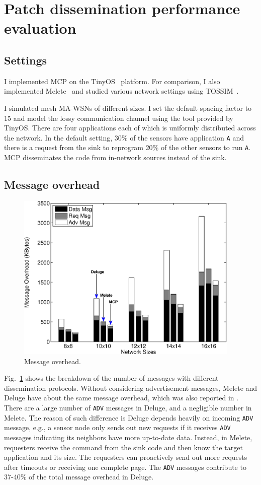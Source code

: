 \section{Patch dissemination performance evaluation}
\subsection{Settings}
I implemented MCP on the TinyOS~\cite{tinyos} platform. For comparison, I also implemented Melete~\cite{melete} and 
studied various network settings using TOSSIM~\cite{tossim}. 

I simulated mesh MA-WSNs of different sizes. I set the default spacing factor to 15 and model the lossy communication 
channel using the tool provided by TinyOS. There are four applications each of which is uniformly distributed across 
the network. In the default setting, 30\% of the sensors have application {\tt A} and there is a request from the sink 
to reprogram 20\% of the other sensors to run {\tt A}. MCP disseminates the code from in-network sources instead of the 
sink. 

\subsection{Message overhead}

\begin{figure}[htbp]
\centering
\includegraphics[width=4.2in]{figures/fsizes.eps}
\caption{Message overhead.}
\label{fmsg}
\end{figure}

Fig.~\ref{fmsg} shows the breakdown of the number of messages with different dissemination protocols. Without 
considering advertisement messages, Melete and Deluge have about the same message overhead, which was also reported in 
\cite{melete}. There are a large number of {\tt ADV} messages in Deluge, and a negligible number in Melete. The reason 
of such difference is Deluge depends heavily on incoming {\tt ADV} message, e.g., a sensor node only sends out new 
requests if it receives {\tt ADV} messages indicating its neighbors have more up-to-date data. Instead, in Melete, 
requesters receive the command from the sink code and then know the target application and its size. The requesters can 
proactively send out more requests after timeouts or receiving one complete page. The {\tt ADV} messages contribute to 
37-40\% of the total message overhead in Deluge. 

